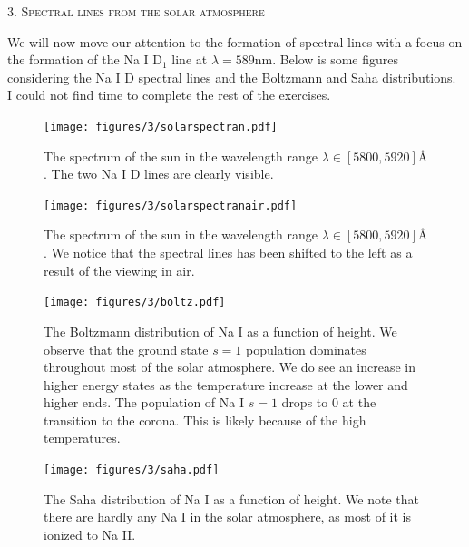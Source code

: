 \documentclass[a4paper,11.5pt,]{article}
\begin{document}
\begin{multicols}{2}
 
\begin{center}
3. \textsc{Spectral lines from the solar atmosphere}
\end{center}

We will now move our attention to the formation of spectral lines with a focus on the formation of the Na I D$_1$ line at $\lambda = 589$nm. Below is some figures considering the Na I D spectral lines and the Boltzmann and Saha distributions. I could not find time to complete the rest of the exercises.

\begin{figure}[H]
    \centering
    \texttt{[image: figures/3/solarspectran.pdf]}
    \caption{The spectrum of the sun in the wavelength range $\lambda \in [5800, 5920]Å$. The two Na I D lines are clearly visible.}
    \label{fig: 3.1}
\end{figure}

\begin{figure}[H]
    \centering
    \texttt{[image: figures/3/solarspectranair.pdf]}
    \caption{The spectrum of the sun in the wavelength range $\lambda \in [5800, 5920]Å$. We notice that the spectral lines has been shifted to the left as a result of the viewing in air.}
    \label{fig: 3.2}
\end{figure}

\begin{figure}[H]
    \centering
    \texttt{[image: figures/3/boltz.pdf]}
    \caption{The Boltzmann distribution of Na I as a function of height. We observe that the ground state $s=1$ population dominates throughout most of the solar atmosphere. We do see an increase in higher energy states as the temperature increase at the lower and higher ends. The population of Na I $s = 1$ drops to 0 at the transition to the corona. This is likely because of the high temperatures.}
    \label{fig: 3.3}
\end{figure}

\begin{figure}[H]
    \centering
    \texttt{[image: figures/3/saha.pdf]}
    \caption{The Saha distribution of Na I as a function of height. We note that there are hardly any Na I in the solar atmosphere, as most of it is ionized to Na II.}
    \label{fig: 3.4}
\end{figure}



\end{multicols}
\end{document}
